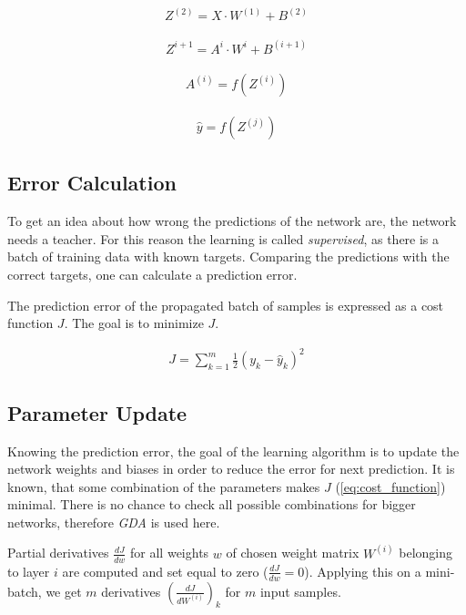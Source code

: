\begin{align}
Z^{(2)} = X \cdot W^{(1)} + B^{(2)}
\end{align}

\begin{align}
Z^{i+1} = A^i \cdot W^i + B^{(i+1)}
\end{align}

\begin{align}
A^{(i)} = f(Z^{(i)})
\end{align}

\begin{align}
\hat{y} = f(Z^{(j)})
\end{align}

\subsection{Error Calculation} \label{ssec:error_calculation}
To get an idea about how wrong the predictions of the network are, the network needs a teacher. For this reason the learning is called \textit{supervised}, as there is a batch of training data with known targets. Comparing the predictions with the correct targets, one can calculate a prediction error. 

The prediction error of the propagated batch of samples is expressed as a cost function $ J $. The goal is to minimize $ J $.

\begin{align} \label{eq:cost_function}
J = \displaystyle{\sum_{k=1}^m} \frac{1}{2}(y_k - \hat{y}_k)^2
\end{align}

\subsection{Parameter Update} \label{ssec:parameter_update}
Knowing the prediction error, the goal of the learning algorithm is to update the network weights and biases in order to reduce the error for next prediction.  It is known, that some combination of the parameters makes $ J $ (\cref{eq:cost_function}) minimal. There is no chance to check all possible combinations for bigger networks, therefore \textit{GDA} is used here.

Partial derivatives $ \frac{dJ}{dw} $ for all weights $ w $ of chosen weight matrix $ W^{(i)} $ belonging to layer $ i $ are computed and set equal to zero ($ \frac{dJ}{dw} = 0 $). Applying this on a mini-batch, we get $ m $ derivatives $ (\frac{dJ}{dW^{(i)}})_k $ for $ m $ input samples. 

